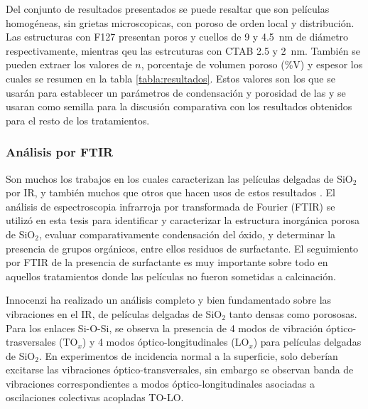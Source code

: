		 	Del conjunto de resultados presentados se puede resaltar que son películas homogéneas, sin grietas microscopicas, con poroso de orden local y distribución. Las \pdm\space estructuras con F127 presentan poros	y cuellos de 9 y \SI{4.5}{\nm} de diámetro respectivamente, mientras qeu las estrcuturas con CTAB 2.5 y \SI{2}{\nm}. También se pueden extraer los valores de $n$, porcentaje de volumen poroso (\%V) y espesor los cuales se resumen en la tabla \ref{tabla:resultados}. Estos valores son los que se usarán para establecer un parámetros de condensación y porosidad de las \pdm y se usaran como semilla para la discusión comparativa con los resultados obtenidos para el resto de los tratamientos.

	    \subsubsection{Análisis por FTIR}\label{sec:Analisis_IR}

		 Son muchos los trabajos en los cuales caracterizan las películas delgadas de SiO$_2$ por IR\cite{Olsen1989,Almeida1990,Redol1997,Innocenzi2003}, y también muchos que otros que hacen usos de estos resultados \cite{Angelome2008,Calvo2008,Calvo20210}.
		 El análisis de espectroscopia infrarroja por transformada de Fourier (FTIR) se utilizó en esta tesis para identificar y caracterizar la estructura inorgánica porosa de SiO$_2$, evaluar comparativamente condensación del óxido, y determinar la presencia de grupos orgánicos, entre ellos residuos de surfactante. El seguimiento por FTIR de la presencia de surfactante es muy importante sobre todo en aquellos tratamientos donde las películas no fueron sometidas a calcinación.

		Innocenzi ha realizado un análisis completo y bien fundamentado sobre las vibraciones en el IR, de películas delgadas de SiO$_2$ tanto densas como porososas.\cite{Innocenzi2003} Para los enlaces Si-O-Si, se observa la presencia de 4 modos de vibración óptico-trasversales (TO$_x$) y 4 modos óptico-longitudinales (LO$_x$) para películas delgadas de SiO$_2$. En experimentos de incidencia normal a la superficie, solo deberían excitarse las vibraciones óptico-transversales, sin embargo se observan banda de vibraciones correspondientes a modos óptico-longitudinales asociadas a oscilaciones colectivas acopladas TO-LO.\cite{Pai1986,Grosse1986,Innocenzi2003}

